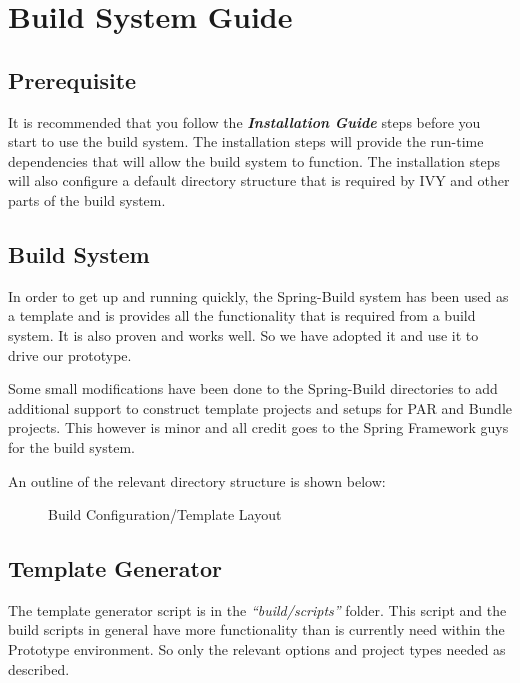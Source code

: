 \chapter{Build System Guide}
\section{Prerequisite}
It is recommended that you follow the \textbf{\textit{Installation Guide}} steps before
you start to use the build system. The installation steps will provide the run-time
dependencies that will allow the build system to function. The installation steps will
also configure a default directory structure that is required by IVY and other parts
of the build system.

\section{Build System}
In order to get up and running quickly, the Spring-Build system has been used as a
template and is provides all the functionality that is required from a build system.
It is also proven and works well. So we have adopted it and use it to drive our prototype.

Some small modifications have been done to the Spring-Build directories to add additional support to construct template projects and setups for PAR and Bundle projects. This however is minor and all credit goes to the Spring Framework guys for the build system.

An outline of the relevant directory structure is shown below:

\begin{figure}[H]
\caption{Build Configuration/Template Layout}
\end{figure}

\section{Template Generator}
The template generator script is in the \textit{``build/scripts''} folder. This script and
the build scripts in general have more functionality than is currently need within the
Prototype environment. So only the relevant options and project types needed as described.

